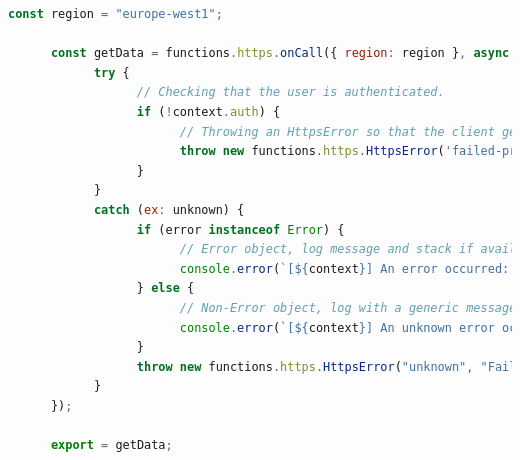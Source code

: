\begin{lstlisting}[language=JavaScript, caption=Example of onCall function with authentication check]
      const region = "europe-west1";

      const getData = functions.https.onCall({ region: region }, async (request: CallableRequest<any>) => {
            try {
                  // Checking that the user is authenticated.
                  if (!context.auth) {
                        // Throwing an HttpsError so that the client gets the error details.
                        throw new functions.https.HttpsError('failed-precondition', 'The function must be called while authenticated.');
                  }
            }
            catch (ex: unknown) {
                  if (error instanceof Error) {
                        // Error object, log message and stack if available
                        console.error(`[${context}] An error occurred: ${error.message} \n Stack: ${error.stack}`);
                  } else {
                        // Non-Error object, log with a generic message.
                        console.error(`[${context}] An unknown error occurred:`, error);
                  }
                  throw new functions.https.HttpsError("unknown", "Failed to retrieve agents", ex);
            }
      });
              
      export = getData;
\end{lstlisting}

